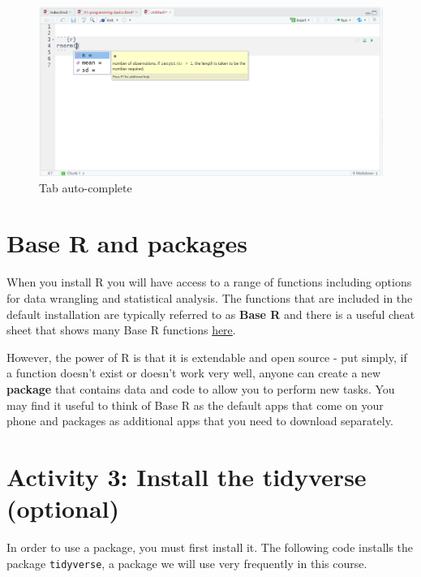 \documentclass[
  oneside]{book}
\begin{document}
\begin{figure}

{\centering \includegraphics[width=1\linewidth]{images/autocomplete} 

}

\caption{Tab auto-complete}\label{fig:img-autocomplete}
\end{figure}

\hypertarget{packages}{%
\section{Base R and packages}\label{packages}}

When you install R you will have access to a range of functions including options for data wrangling and statistical analysis. The functions that are included in the default installation are typically referred to as \textbf{Base R} and there is a useful cheat sheet that shows many Base R functions \href{https://www.rstudio.com/wp-content/uploads/2016/05/base-r.pdf}{here}.

However, the power of R is that it is extendable and open source - put simply, if a function doesn't exist or doesn't work very well, anyone can create a new \textbf{package} that contains data and code to allow you to perform new tasks. You may find it useful to think of Base R as the default apps that come on your phone and packages as additional apps that you need to download separately.

\hypertarget{activity-3-install-the-tidyverse-optional}{%
\section{Activity 3: Install the tidyverse (optional)}\label{activity-3-install-the-tidyverse-optional}}

In order to use a package, you must first install it. The following code installs the package \texttt{tidyverse}, a package we will use very frequently in this course.
\end{document}
